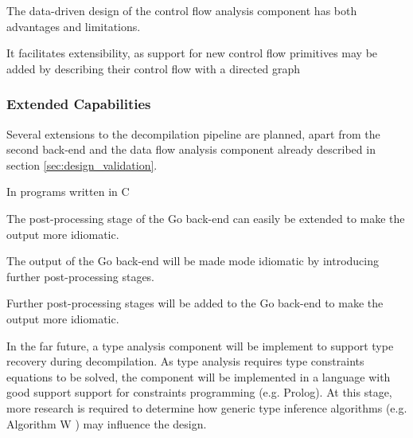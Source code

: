 

The data-driven design of the control flow analysis component has both advantages and limitations.

It facilitates extensibility, as support for new control flow primitives may be added by describing their control flow with a directed graph


\subsubsection{Extended Capabilities}

Several extensions to the decompilation pipeline are planned, apart from the second back-end and the data flow analysis component already described in section \ref{sec:design_validation}.

In programs written in C

The post-processing stage of the Go back-end can easily be extended to make the output more idiomatic.

The output of the Go back-end will be made mode idiomatic by introducing further post-processing stages.

Further post-processing stages will be added to the Go back-end to make the output more idiomatic.


In the far future, a type analysis component will be implement to support type recovery during decompilation. As type analysis requires type constraints equations to be solved, the component will be implemented in a language with good support support for constraints programming (e.g. Prolog). At this stage, more research is required to determine how generic type inference algorithms (e.g. Algorithm W \cite{algorithm_w}) may influence the design.
